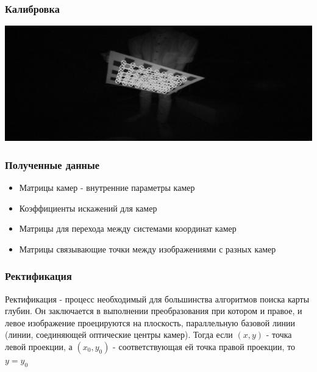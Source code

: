 \documentclass{beamer}
\begin{document}
		\begin{frame}
		    \frametitle{Калибровка}
		   
		    \begin{center}
				\includegraphics[scale=0.7]{images/leftCo2}
			\end{center}
		\end{frame}
		\begin{frame}
			\frametitle{Полученные данные}
			\begin{itemize}
				\item Матрицы камер - внутренние параметры камер
				\item Коэффициенты искажений для камер
				\item Матрицы для перехода между системами координат камер
				\item Матрицы связывающие точки между изображениями с разных камер
			\end{itemize}
		\end{frame}
		\begin{frame}
			\frametitle{Ректификация}
			Ректификация - процесс необходимый для большинства алгоритмов поиска карты глубин. Он заключается в выполнении преобразования при котором и правое, и левое изображение проецируются на плоскость, параллельную базовой линии (линии, соединяющей оптические центры камер). Тогда если $(x, y)$ - точка левой проекции, а $(x_{0},y_{0})$ - соответствующая ей точка правой проекции, то $y = y_{0}$
		\end{frame}
\end{document}
